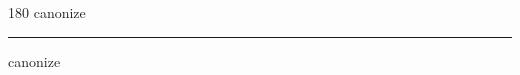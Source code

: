 
\begin{frame}
\begin{center}
\begin{turn}{180}
{\fontsize{2.5cm}{1em}\selectfont canonize}
\end{turn}
\vspace{1em}\par  
\hrule
\vspace{1em}\par  
{\fontsize{2.5cm}{1em}\selectfont canonize}
\end{center}
\end{frame}
